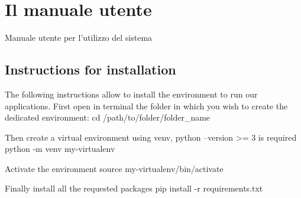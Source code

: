 \chapter{Il manuale utente}
\label{appendiceD}
\thispagestyle{empty}

\noindent Manuale utente per l'utilizzo del sistema

\section{Instructions for installation}

The following instructions allow to install the environment to run our applications. 
First open in terminal the folder in which you wish to create the dedicated environment:
cd /path/to/folder/folder_name

Then create a virtual environment using venv, python --version >= 3 is required
python -m venv my-virtualenv

Activate the environment
source my-virtualenv/bin/activate

Finally  install all the requested packages 
pip install -r requirements.txt

